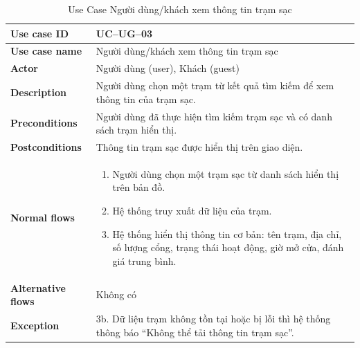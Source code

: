 \begin{itemize}
\begin{longtable}{|m{}|m{}|}
          \caption{Use Case Người dùng/khách xem thông tin trạm sạc} \\
  \hline
  \textbf{Use case ID} & UC--UG--03 \\
  \hline
  \textbf{Use case name} & Người dùng/khách xem thông tin trạm sạc \\
  \hline
  \textbf{Actor} & Người dùng (user), Khách (guest) \\
  \hline
  \textbf{Description} & Người dùng chọn một trạm từ kết quả tìm kiếm để xem thông tin của trạm sạc. \\
  \hline
  \textbf{Preconditions} & Người dùng đã thực hiện tìm kiếm trạm sạc và có danh sách trạm hiển thị. \\
  \hline
  \textbf{Postconditions} & Thông tin trạm sạc được hiển thị trên giao diện. \\
  \hline
  \textbf{Normal flows} &
  \begin{enumerate}[label=\arabic*.]
    \item Người dùng chọn một trạm sạc từ danh sách hiển thị trên bản đồ.
    \item Hệ thống truy xuất dữ liệu của trạm.
    \item Hệ thống hiển thị thông tin cơ bản: tên trạm, địa chỉ, số lượng cổng, trạng thái hoạt động, giờ mở cửa, đánh giá trung bình.
  \end{enumerate}\\
  \hline
  \textbf{Alternative flows} & Không có\\
  \hline
  \textbf{Exception} &
  3b. Dữ liệu trạm không tồn tại hoặc bị lỗi thì hệ thống thông báo “Không thể tải thông tin trạm sạc”.\\
  \hline
  \end{longtable}


\end{itemize}
